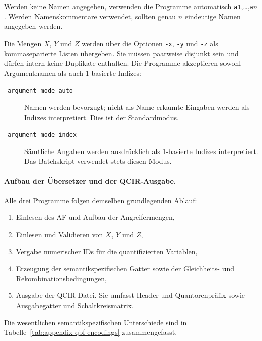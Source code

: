 Werden keine Namen angegeben, verwenden die Programme automatisch
\texttt{a1},\ldots,\texttt{a\(n\)}. Werden Namenskommentare verwendet,
sollten genau \(n\) eindeutige Namen angegeben werden.

Die Mengen \(X\), \(Y\) und \(Z\) werden über die Optionen
\texttt{-x}, \texttt{-y} und \texttt{-z} als kommaseparierte Listen
übergeben. Sie müssen paarweise disjunkt sein und dürfen intern keine
Duplikate enthalten. Die Programme akzeptieren sowohl Argumentnamen
als auch 1-basierte Indizes:
\begin{description}
    \item[\texttt{--argument-mode auto}]
        Namen werden bevorzugt; nicht als Name erkannte Eingaben
        werden als Indizes interpretiert. Dies ist der Standardmodus.
    \item[\texttt{--argument-mode index}]
        Sämtliche Angaben werden ausdrücklich als 1-basierte Indizes
        interpretiert. Das Batchskript verwendet stets diesen Modus.
\end{description}

\paragraph{Aufbau der Übersetzer und der QCIR-Ausgabe.}

Alle drei Programme folgen demselben grundlegenden Ablauf:
\begin{enumerate}
    \item Einlesen des AF und Aufbau der Angreifermengen,
    \item Einlesen und Validieren von \(X\), \(Y\) und \(Z\),
    \item Vergabe numerischer IDs für die quantifizierten Variablen,
    \item Erzeugung der semantikspezifischen Gatter sowie der
          Gleichheits- und Rekombinationsbedingungen,
    \item Ausgabe der QCIR-Datei. Sie umfasst Header und
          Quantorenpräfix sowie Ausgabegatter und Schaltkreismatrix.
\end{enumerate}
Die wesentlichen semantikspezifischen Unterschiede sind in
Tabelle~\ref{tab:appendix-qbf-encodings} zusammengefasst.

